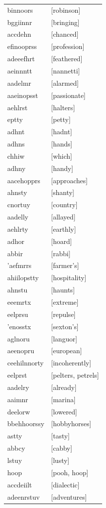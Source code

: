 \documentclass{article}
\begin{document}
\begin{tabular}{ll}
binnoors & [robinson] \\
bggiinnr & [bringing] \\
accdehn & [chanced] \\
efinooprss & [profession] \\
adeeefhrt & [feathered] \\
aeinnntt & [nannetti] \\
aadelmr & [alarmed] \\
aaeinopsst & [passionate] \\
aehlrst & [halters] \\
eptty & [petty] \\
adhnt & [hadnt] \\
adhns & [hands] \\
chhiw & [which] \\
adhny & [handy] \\
aacehopprs & [approaches] \\
ahnsty & [shanty] \\
cnortuy & [country] \\
aadelly & [allayed] \\
aehlrty & [earthly] \\
adhor & [hoard] \\
abbir & [rabbi] \\
'aefmrrs & [farmer's] \\
ahiilopstty & [hospitality] \\
ahnstu & [haunts] \\
eeemrtx & [extreme] \\
eelprsu & [repulse] \\
'enosstx & [sexton's] \\
aglnoru & [languor] \\
aeenopru & [european] \\
ceehilnnorty & [incoherently] \\
eelprst & [pelters, petrels] \\
aadelry & [already] \\
aaimnr & [marina] \\
deelorw & [lowered] \\
bbehhoorssy & [hobbyhorses] \\
astty & [tasty] \\
abbcy & [cabby] \\
lstuy & [lusty] \\
hoop & [pooh, hoop] \\
accdeiilt & [dialectic] \\
adeenrstuv & [adventures] \\

\end{tabular}
\end{document}
